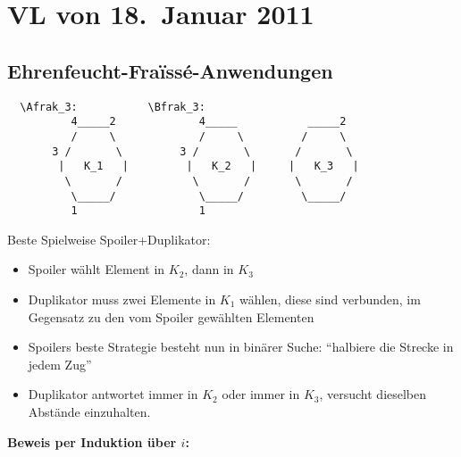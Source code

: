\section{VL von 18.~Januar 2011}

\subsection{Ehrenfeucht-Fraïssé-Anwendungen}

\begin{verbatim}
  \Afrak_3:           \Bfrak_3:
          4_____2             4_____           _____2
          /     \             /     \         /     \
       3 /       \         3 /       \       /       \
        |   K_1   |         |   K_2   |     |   K_3   |
         \       /           \       /       \       /
          \_____/             \_____/         \_____/
          1                   1
\end{verbatim}

Beste Spielweise Spoiler+Duplikator:

\begin{itemize}
  \item Spoiler wählt Element in $K_2$, dann in $K_3$
  \item Duplikator muss zwei Elemente in $K_1$ wählen, diese sind
  verbunden, im Gegensatz zu den vom Spoiler gewählten Elementen
  \item Spoilers beste Strategie besteht nun in binärer Suche:
  \enquote{halbiere die Strecke in jedem Zug}
  \item Duplikator antwortet immer in $K_2$ oder immer in $K_3$,
  versucht dieselben Abstände einzuhalten.
\end{itemize}

\textbf{Beweis per Induktion über $i$:}

